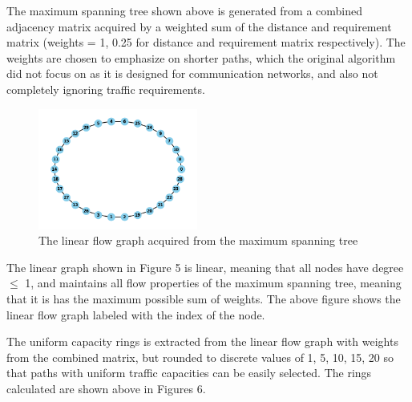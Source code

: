\documentclass[11pt]{article}
\begin{document}
\par
The maximum spanning tree shown above is generated from a combined adjacency matrix acquired by a weighted sum of the distance and requirement matrix (weights = 1, 0.25 for distance and requirement matrix respectively). The weights are chosen to emphasize on shorter paths, which the original algorithm did not focus on as it is designed for communication networks, and also not completely ignoring traffic requirements. 
\begin{figure}[H]
\centering
\includegraphics[height=150px]{lfg.png}
\caption{The linear flow graph acquired from the maximum spanning tree}
\end{figure}
\par
The linear graph shown in Figure 5 is linear, meaning that all nodes have degree $\leq$ 1, and maintains all flow properties of the maximum spanning tree, meaning that it is has the maximum possible sum of weights. The above figure shows the linear flow graph labeled with the index of the node. \par
	The uniform capacity rings is extracted from the linear flow graph with weights from the combined matrix, but rounded to discrete values of 1, 5, 10, 15, 20 so that paths with uniform traffic capacities can be easily selected. The rings calculated are shown above in Figures 6. \par
\end{document}
